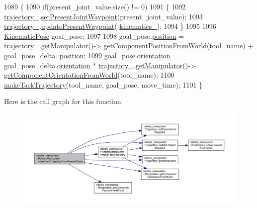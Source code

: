 \begin{DoxyCode}
1089 \{
1090   \textcolor{keywordflow}{if}(present\_joint\_value.size() != 0)
1091   \{
1092     \hyperlink{classrobotis__manipulator_1_1_robotis_manipulator_a992d2c7221bcaab8e9a688d12728d738}{trajectory\_}.\hyperlink{classrobotis__manipulator_1_1_trajectory_a58b1d4fb60f7e3ed9150d312766debc1}{setPresentJointWaypoint}(present\_joint\_value);
1093     \hyperlink{classrobotis__manipulator_1_1_robotis_manipulator_a992d2c7221bcaab8e9a688d12728d738}{trajectory\_}.\hyperlink{classrobotis__manipulator_1_1_trajectory_a05e95f1473723592130f63321664fb0c}{updatePresentWaypoint}(
      \hyperlink{classrobotis__manipulator_1_1_robotis_manipulator_a9a37fd068504dfe5fab346884790fc8f}{kinematics\_});
1094   \}
1095 
1096   \hyperlink{structrobotis__manipulator_1_1_kinematic_pose}{KinematicPose} goal\_pose;
1097 
1098   goal\_pose.\hyperlink{structrobotis__manipulator_1_1_kinematic_pose_a8700e7ae2388242cf540e884d52fd97a}{position} = \hyperlink{classrobotis__manipulator_1_1_robotis_manipulator_a992d2c7221bcaab8e9a688d12728d738}{trajectory\_}.\hyperlink{classrobotis__manipulator_1_1_trajectory_ae5276de42edf154de107c1f194f6b322}{getManipulator}()->
      \hyperlink{classrobotis__manipulator_1_1_manipulator_a04b2efdf66bc0e4bd04dc9aafd9f2d47}{getComponentPositionFromWorld}(tool\_name) + goal\_pose\_delta.
      \hyperlink{structrobotis__manipulator_1_1_kinematic_pose_a8700e7ae2388242cf540e884d52fd97a}{position};
1099   goal\_pose.\hyperlink{structrobotis__manipulator_1_1_kinematic_pose_a0506da3cc344d21656fdd1befdd7fa27}{orientation} = goal\_pose\_delta.\hyperlink{structrobotis__manipulator_1_1_kinematic_pose_a0506da3cc344d21656fdd1befdd7fa27}{orientation} * 
      \hyperlink{classrobotis__manipulator_1_1_robotis_manipulator_a992d2c7221bcaab8e9a688d12728d738}{trajectory\_}.\hyperlink{classrobotis__manipulator_1_1_trajectory_ae5276de42edf154de107c1f194f6b322}{getManipulator}()->
      \hyperlink{classrobotis__manipulator_1_1_manipulator_a9228f1f4b7fd627da2a618b79b2f0c0b}{getComponentOrientationFromWorld}(tool\_name);
1100   \hyperlink{classrobotis__manipulator_1_1_robotis_manipulator_af99e51e771170748507ac7c750b515da}{makeTaskTrajectory}(tool\_name, goal\_pose, move\_time);
1101 \}
\end{DoxyCode}


Here is the call graph for this function\+:\nopagebreak
\begin{figure}[H]
\begin{center}
\leavevmode
\includegraphics[width=350pt]{classrobotis__manipulator_1_1_robotis_manipulator_ae5b27f917fb52adb0c115f9244f732c9_cgraph}
\end{center}
\end{figure}


